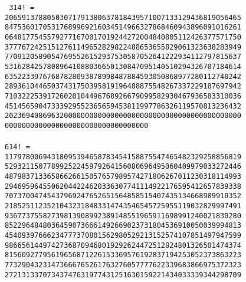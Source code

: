 \documentclass[12pt, a4paper]{article}
\begin{document}
{\tt
314! = \\
20659137880503071791380637818439571007133129436819056465\\
84753601705317689969216034514966327868460943896091016261\\
06481775455792771670017019244272004840805112426377571750\\
37776724251512761149652829822488653655829061323638283949\\
77091205890547695526152937530587052641222934112797815637\\
53162842578089641088036650130847095140510294326707184614\\
63522339767687828093878998487884593050868977280112740242\\
28936104465037431750395819196488875548267337229187697942\\
71032225391726020104496768926679099582930467936583310036\\
45145659047333929552365659453811997786326119570813236432\\
20236940869632000000000000000000000000000000000000000000\\
0000000000000000000000000000000000 \\
\\
614! =\\
11797800694318095394658783454158875547465482329258856819\\
52932115077899252245979264156080696495060409979033272446\\
48798371336586626615057657989574271806267011230318114993\\
29469596455062044224620336307741114922176595412657839338\\
70737004745437969247652651564858515407435134668989910352\\
21852511235210432318483314743546545725955119032829997491\\
93677375582739813908992389148551965911698991240021830280\\
85229648480364590736661492669023731804536910050039994813\\
45409397666234777370801562980529213152574107851497947599\\
98665614497427368709468019292624472512824801326501474374\\
81560927795619656871226153369576192837194253052373863223\\
77329043231473666765261763276057777622339683866975372323\\
27213133707343747631977431251630159221434033339344298709\\
}
\end{document}
